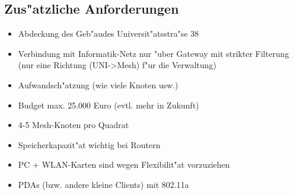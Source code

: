 \subsection{Zus"atzliche Anforderungen}
\begin{itemize}
	\item Abdeckung des Geb"audes Universit"atsstra"se 38
	\item Verbindung mit Informatik-Netz nur "uber Gateway
	mit strikter Filterung (nur eine Richtung (UNI->Mesh)
	f"ur die Verwaltung)
	\item Aufwandsch"atzung (wie viele Knoten usw.)
	\item Budget max. 25.000 Euro (evtl. mehr in Zukunft)
	\item 4-5 Mesh-Knoten pro Quadrat 
	\item Speicherkapazit"at wichtig bei Routern
	\item PC + WLAN-Karten sind wegen Flexibilit"at vorzuziehen
	\item PDAs (bzw. andere kleine Clients) mit 802.11a
\end{itemize}


